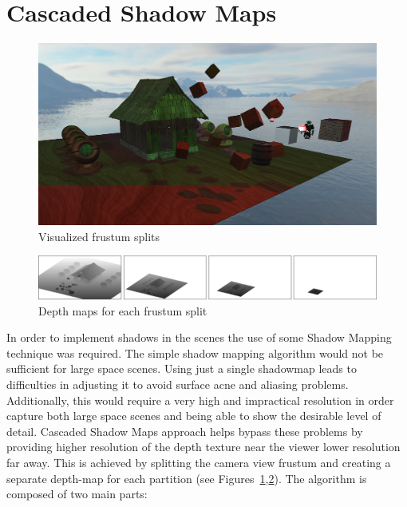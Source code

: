 \section{Cascaded Shadow Maps}

\begin{figure}[h]
    \centering
    \includegraphics[scale=0.25, clip=true]{./image/csmsplits.png}
    \caption{Visualized frustum splits}
\label{fig:csmsplits}
\end{figure}

\begin{figure}[b]
    \centering
    \includegraphics[scale=0.3, clip=true]{./image/csmbufs.png}
    \caption{Depth maps for each frustum split}
\label{fig:csmbufs}
\end{figure}

In order to implement shadows in the scenes the use of some Shadow Mapping technique was required.
The simple shadow mapping algorithm would not be sufficient for large space scenes. Using just
a single shadowmap leads to difficulties in adjusting it to avoid surface acne and aliasing
problems. Additionally, this would require a very high and impractical resolution in order capture both large
space scenes and being able to show the desirable level of detail. Cascaded Shadow Maps approach
helps bypass these problems by providing higher resolution of the depth texture near the viewer lower
resolution far away. This is achieved by splitting the camera view frustum and creating a separate depth-map
for each partition (see Figures~\ref{fig:csmsplits},\ref{fig:csmbufs}). The algorithm is composed of two main parts:

